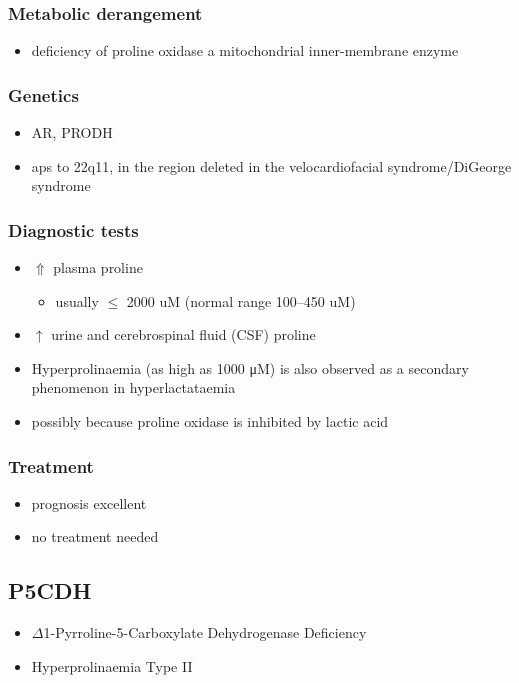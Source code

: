 \documentclass{scrartcl}
\begin{document}
\subsubsection{Metabolic derangement}
\label{sec:orgecc89ea}
\begin{itemize}
\item deficiency of proline oxidase a mitochondrial inner-membrane enzyme
\end{itemize}
\subsubsection{Genetics}
\label{sec:orgc0b819e}
\begin{itemize}
\item AR, PRODH
\item aps to 22q11, in the region deleted in the velocardiofacial
syndrome/DiGeorge syndrome
\end{itemize}

\subsubsection{Diagnostic tests}
\label{sec:orgc204bb7}
\begin{itemize}
\item \(\Uparrow\) plasma proline
\begin{itemize}
\item usually \(\le\) 2000 uM (normal range 100–450 uM)
\end{itemize}
\item \(\uparrow\) urine and cerebrospinal fluid (CSF) proline
\item Hyperprolinaemia (as high as 1000 μM) is also observed as a
secondary phenomenon in hyperlactataemia
\item possibly because proline oxidase is inhibited by lactic acid
\end{itemize}

\subsubsection{Treatment}
\label{sec:org6bd5d65}
\begin{itemize}
\item prognosis excellent
\item no treatment needed
\end{itemize}

\subsection{P5CDH}
\label{sec:org911cd29}
\begin{itemize}
\item \(\Delta\)1-Pyrroline-5-Carboxylate Dehydrogenase Deficiency
\item Hyperprolinaemia Type II
\end{itemize}
\end{document}
